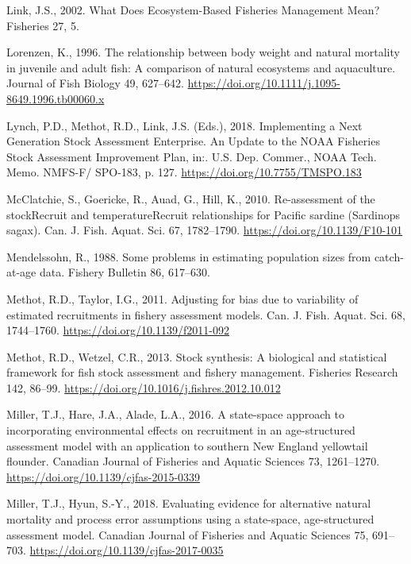 \documentclass[]{article}
\begin{document}
\leavevmode\hypertarget{ref-link2002What}{}%
Link, J.S., 2002. What Does Ecosystem-Based Fisheries Management Mean?
Fisheries 27, 5.

\leavevmode\hypertarget{ref-lorenzen1996Relationship}{}%
Lorenzen, K., 1996. The relationship between body weight and natural
mortality in juvenile and adult fish: A comparison of natural ecosystems
and aquaculture. Journal of Fish Biology 49, 627--642.
\url{https://doi.org/10.1111/j.1095-8649.1996.tb00060.x}

\leavevmode\hypertarget{ref-lynch2018Implementing}{}%
Lynch, P.D., Methot, R.D., Link, J.S. (Eds.), 2018. Implementing a Next
Generation Stock Assessment Enterprise. An Update to the NOAA Fisheries
Stock Assessment Improvement Plan, in:. U.S. Dep. Commer., NOAA Tech.
Memo. NMFS-F/ SPO-183, p. 127. \url{https://doi.org/10.7755/TMSPO.183}

\leavevmode\hypertarget{ref-mcclatchie2010Reassessment}{}%
McClatchie, S., Goericke, R., Auad, G., Hill, K., 2010. Re-assessment of
the stockRecruit and temperatureRecruit relationships for Pacific
sardine (Sardinops sagax). Can. J. Fish. Aquat. Sci. 67, 1782--1790.
\url{https://doi.org/10.1139/F10-101}

\leavevmode\hypertarget{ref-mendelssohn1988Problems}{}%
Mendelssohn, R., 1988. Some problems in estimating population sizes from
catch-at-age data. Fishery Bulletin 86, 617--630.

\leavevmode\hypertarget{ref-methot2011Adjusting}{}%
Methot, R.D., Taylor, I.G., 2011. Adjusting for bias due to variability
of estimated recruitments in fishery assessment models. Can. J. Fish.
Aquat. Sci. 68, 1744--1760. \url{https://doi.org/10.1139/f2011-092}

\leavevmode\hypertarget{ref-methot2013Stock}{}%
Methot, R.D., Wetzel, C.R., 2013. Stock synthesis: A biological and
statistical framework for fish stock assessment and fishery management.
Fisheries Research 142, 86--99.
\url{https://doi.org/10.1016/j.fishres.2012.10.012}

\leavevmode\hypertarget{ref-miller2016Statespace}{}%
Miller, T.J., Hare, J.A., Alade, L.A., 2016. A state-space approach to
incorporating environmental effects on recruitment in an age-structured
assessment model with an application to southern New England yellowtail
flounder. Canadian Journal of Fisheries and Aquatic Sciences 73,
1261--1270. \url{https://doi.org/10.1139/cjfas-2015-0339}

\leavevmode\hypertarget{ref-miller2018Evaluating}{}%
Miller, T.J., Hyun, S.-Y., 2018. Evaluating evidence for alternative
natural mortality and process error assumptions using a state-space,
age-structured assessment model. Canadian Journal of Fisheries and
Aquatic Sciences 75, 691--703.
\url{https://doi.org/10.1139/cjfas-2017-0035}
\end{document}

